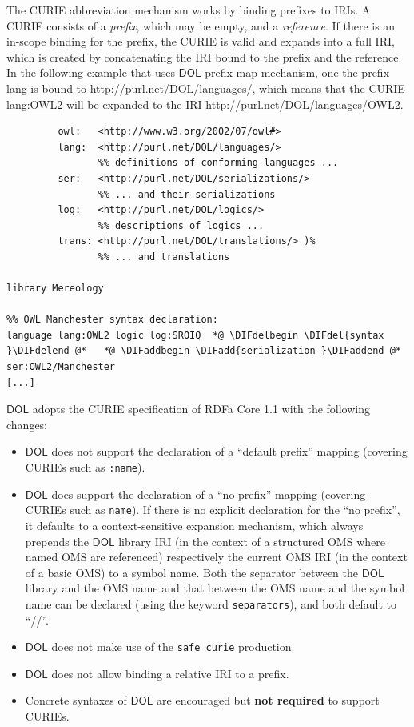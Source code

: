 \documentclass[10pt,fleqn,final]{scrreprt}
\makeatletter
\newcommand*\CommentAuthor{}
\renewcommand*\CommentAuthor{#1}}
\newcommand*\CommentDate{}
\renewcommand*\CommentDate{#1}}
\newcommand*\CommentId{}
\renewcommand*\CommentId{#1}}
\newcommand*\CommentType{}
\renewcommand*\CommentType{#1}}
\newcommand*{\SetCommentColorByType}[1]{%
\edef\localType{{#1}}%
\expandafter\ifstrequal\localType{q-aut}{\colorlet{CommentColor}{red}}{%
\expandafter\ifstrequal\localType{q-all}{\colorlet{CommentColor}{orange}}{%
\expandafter\ifstrequal\localType{todo}{\colorlet{CommentColor}{orange}}{%
\expandafter\ifstrequal\localType{fyi}{\colorlet{CommentColor}{lightgray}}{%
\colorlet{CommentColor}{yellow}}}}}}
\newcommand*{\SetCommentPrefixByType}[1]{%
\edef\localType{{#1}}%
\expandafter\@ifmtarg\localType{%
\edef\CommentPrefix{}%
}{%
\caseupper[q]{#1}%
\edef\CommentPrefix{\thestring: }%
}}
\newcommand*{\initComment}[1]{%
\setkeys{Comment}{#1}%
\SetCommentColorByType{\CommentType}%
\relax%
\SetCommentPrefixByType{\CommentType}%
\relax%
}
\newcommand*{\todonote}[2][]{%
\initComment{#1}%
\pdfcomment[author=\CommentAuthor,color=CommentColor,date=\CommentDate,id=\CommentId]{%
\CommentPrefix
#2}}
\renewcommand*{\todonote}[2][]{%
\initComment{#1}%
\ednote{\CommentPrefix #2}}
\newcommand*{\CLnote}[2][author=Christoph Lange]{%
\todonote[author=Christoph Lange,#1]{#2} 
}
\newcommand*{\syntax}[1]{\texttt{#1}}
\newcommand*{\notrequired}{\textbf{not required}\xspace}
\newcommand*{\DOL}{\ensuremath{\mathsf{DOL}}\xspace}
\newcommand{\noterefname}{note}
\newcommand{\nref}[1]{\noterefname~\ref{#1}}
\renewcommand{\nref}[1]{\ref{nref-#1}} %
\providecommand{\DIFadd}[1]{{\protect\color{blue}\uwave{#1}}} %
\providecommand{\DIFdel}[1]{{\protect\color{red}\sout{#1}}}                      %
\providecommand{\DIFaddbegin}{} %
\providecommand{\DIFaddend}{} %
\providecommand{\DIFdelbegin}{} %
\providecommand{\DIFdelend}{} %
\makeatother
\begin{document}
The CURIE abbreviation mechanism works by binding prefixes to IRIs.  A CURIE consists of a 
\emph{prefix}, which may be empty, and a \emph{reference}.  If there is an in-scope binding for the 
prefix, the CURIE is valid and expands into a full IRI, which is created by concatenating the IRI 
bound to the prefix and the reference.  In the following example that uses \DOL prefix map mechanism, one the prefix \url{lang} is bound to \url{http://purl.net/DOL/languages/}, which
means that the CURIE \url{lang:OWL2} will be expanded to the IRI
\url{http://purl.net/DOL/languages/OWL2}.

\begin{lstlisting}[basicstyle=\ttfamily,language=dolText,escapechar=@,mathescape]
%prefix( :      <http://www.example.org/mereology#>
         owl:   <http://www.w3.org/2002/07/owl#>
         lang:  <http://purl.net/DOL/languages/>
                %% definitions of conforming languages ...
         ser:   <http://purl.net/DOL/serializations/>
                %% ... and their serializations
         log:   <http://purl.net/DOL/logics/>
                %% descriptions of logics ...
         trans: <http://purl.net/DOL/translations/> )%
                %% ... and translations

library Mereology

%% OWL Manchester syntax declaration: 
language lang:OWL2 logic log:SROIQ  *@ \DIFdelbegin \DIFdel{syntax }\DIFdelend @*   *@ \DIFaddbegin \DIFadd{serialization }\DIFaddend @*  ser:OWL2/Manchester
[...]
\end{lstlisting}


\DOL adopts the CURIE specification of RDFa Core 1.1 \DIFdelbegin %
\DIFdelend \DIFaddbegin \DIFadd{\nref{RDFa}, Section 6 }\DIFaddend with the following changes:
\begin{itemize}
\item \DOL does not support the declaration of a ``default prefix'' mapping %
(covering CURIEs such as \syntax{:name}).
\item \DOL does support the declaration  of a ``no prefix'' mapping (covering CURIEs such as 
\syntax{name}). If there is no explicit declaration for the ``no prefix'', it defaults to a 
context-sensitive expansion mechanism, which always prepends the \DOL library IRI (in the context of a 
structured OMS where named OMS are referenced) respectively the current OMS IRI (in the context of a basic
OMS) to a symbol name. Both the separator between the \DOL library and the OMS name and that between the 
OMS name and the symbol name can be declared (using the keyword \syntax{separators}), and both default to ``//''.

\item \DOL does not make use of the \syntax{safe\_curie} production.
\item \DOL does not allow binding a relative IRI to a prefix.
\item Concrete syntaxes of \DOL are encouraged but \notrequired to support CURIEs.
\end{itemize}
\end{document}
